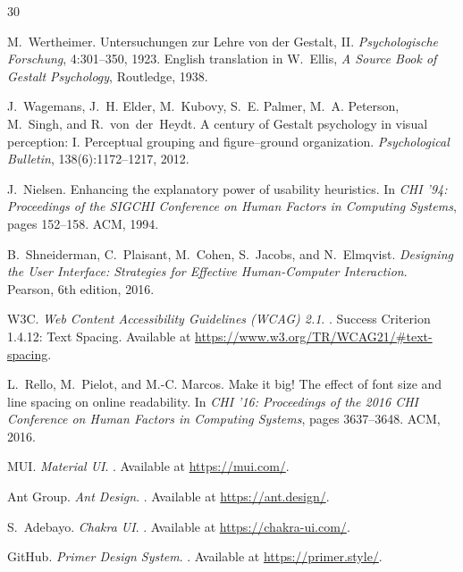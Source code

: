 \begin{thebibliography}{30}

M.~Wertheimer.
\newblock Untersuchungen zur Lehre von der Gestalt, {II}.
\newblock \emph{Psychologische Forschung}, 4:301--350, 1923.
\newblock English translation in W.~Ellis, \emph{A Source Book of Gestalt
  Psychology}, Routledge, 1938.

J.~Wagemans, J.~H. Elder, M.~Kubovy, S.~E. Palmer, M.~A. Peterson, M.~Singh,
  and R.~von~der~Heydt.
\newblock A century of {G}estalt psychology in visual perception: {I}.
  {P}erceptual grouping and figure--ground organization.
\newblock \emph{Psychological Bulletin}, 138(6):1172--1217, 2012.

J.~Nielsen.
\newblock Enhancing the explanatory power of usability heuristics.
\newblock In \emph{CHI '94: Proceedings of the SIGCHI Conference on Human
  Factors in Computing Systems}, pages 152--158. ACM, 1994.

B.~Shneiderman, C.~Plaisant, M.~Cohen, S.~Jacobs, and N.~Elmqvist.
\newblock \emph{Designing the User Interface: Strategies for Effective
  Human-Computer Interaction}.
\newblock Pearson, 6th edition, 2016.


W3C.
\newblock \emph{Web Content Accessibility Guidelines (WCAG) 2.1}.
.
\newblock Success Criterion 1.4.12: Text Spacing.
\newblock Available at \url{https://www.w3.org/TR/WCAG21/#text-spacing}.

L.~Rello, M.~Pielot, and M.-C. Marcos.
\newblock Make it big! {T}he effect of font size and line spacing on online
  readability.
\newblock In \emph{CHI '16: Proceedings of the 2016 CHI Conference on Human
  Factors in Computing Systems}, pages 3637--3648. ACM, 2016.


MUI.
\newblock \emph{Material UI}.
.
\newblock Available at \url{https://mui.com/}.

Ant Group.
\newblock \emph{Ant Design}.
.
\newblock Available at \url{https://ant.design/}.

S.~Adebayo.
\newblock \emph{Chakra UI}.
.
\newblock Available at \url{https://chakra-ui.com/}.

GitHub.
\newblock \emph{Primer Design System}.
.
\newblock Available at \url{https://primer.style/}.


\end{thebibliography}
